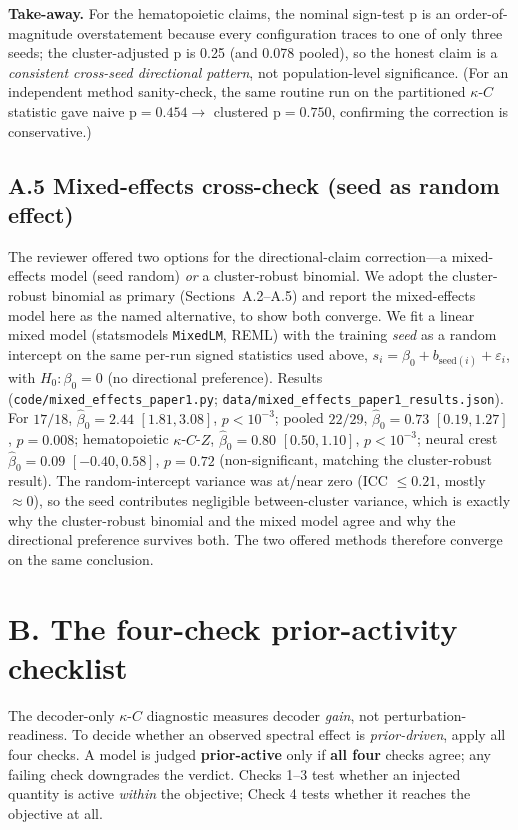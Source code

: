\documentclass[11 pt,a4 paper]{article}
\begin{document}
\noindent\textbf{Take-away.} For the hematopoietic claims, the nominal sign-test p is an
order-of-magnitude overstatement because every configuration traces to one of
only three seeds; the cluster-adjusted p is 0.25 (and 0.078 pooled), so the
honest claim is a \emph{consistent cross-seed directional pattern}, not
population-level significance. (For an independent method sanity-check, the same
routine run on the partitioned $\kappa$-$C$ statistic gave naive
p$=0.454\to$ clustered p$=0.750$, confirming the correction is conservative.)

\subsection*{A.5 Mixed-effects cross-check (seed as random effect)}

The reviewer offered two options for the directional-claim correction---a
mixed-effects model (seed random) \emph{or} a cluster-robust binomial. We adopt
the cluster-robust binomial as primary (Sections~A.2--A.5) and report the
mixed-effects model here as the named alternative, to show both converge. We fit
a linear mixed model (statsmodels \texttt{MixedLM}, REML) with the training
\emph{seed} as a random intercept on the same per-run signed statistics used
above, $s_i = \beta_0 + b_{\mathrm{seed}(i)} + \varepsilon_i$, with
$H_0:\beta_0=0$ (no directional preference). Results
(\texttt{code/mixed\_effects\_paper1.py};
\texttt{data/mixed\_effects\_paper1\_results.json}). For $17/18$,
$\hat\beta_0=2.44$ $[1.81, 3.08]$, $p<10^{-3}$; pooled $22/29$,
$\hat\beta_0=0.73$ $[0.19, 1.27]$, $p=0.008$; hematopoietic $\kappa$-$C$-$Z$,
$\hat\beta_0=0.80$ $[0.50, 1.10]$, $p<10^{-3}$; neural crest
$\hat\beta_0=0.09$ $[-0.40, 0.58]$, $p=0.72$ (non-significant, matching the
cluster-robust result). The random-intercept variance was at/near zero
(ICC $\le 0.21$, mostly $\approx 0$), so the seed contributes negligible
between-cluster variance, which is exactly why the cluster-robust binomial and
the mixed model agree and why the directional preference survives both. The two
offered methods therefore converge on the same conclusion.

\clearpage
\section*{B. The four-check prior-activity checklist}

The decoder-only $\kappa$-$C$ diagnostic measures decoder \emph{gain}, not
perturbation-readiness. To decide whether an observed spectral effect is
\emph{prior-driven}, apply all four checks. A model is judged
\textbf{prior-active} only if \textbf{all four} checks agree; any failing check
downgrades the verdict. Checks 1--3 test whether an injected quantity is
active \emph{within} the objective; Check 4 tests whether it reaches the
objective at all.
\end{document}
